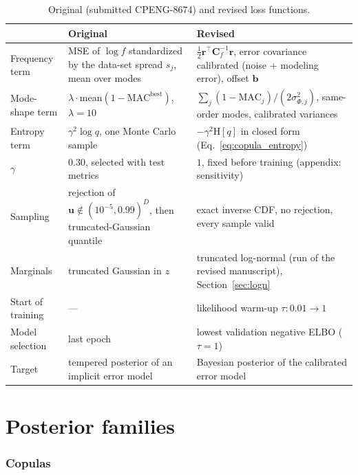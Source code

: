 \documentclass[11pt,a4paper]{article}
\numberwithin{equation}{section}
\theoremstyle{plain}
\theoremstyle{definition}
\theoremstyle{remark}
\newcommand{\uu}{\mathbf{u}}
\newcommand{\rr}{\mathbf{r}}
\newcommand{\bb}{\mathbf{b}}
\newcommand{\Cb}{\mathbf{C}}
\newcommand{\Hent}{\mathrm{H}}
\newcommand{\MAC}{\mathrm{MAC}}
\begin{document}
\begin{table}[h]
\centering
\caption{Original (submitted CPENG-8674) and revised loss functions.}
\label{tab:comparison}
\small
\begin{tabular}{@{}p{3.0cm}p{5.6cm}p{5.6cm}@{}}
\toprule
 & Original & Revised \\
\midrule
Frequency term & MSE of $\log f$ standardized by the data-set spread $s_j$, mean over modes & $\tfrac12\rr^\top\Cb_f^{-1}\rr$, error covariance calibrated (noise $+$ modeling error), offset $\bb$ \\
Mode-shape term & $\lambda\cdot$mean$(1-\MAC^{\text{best}})$, $\lambda=10$ & $\sum_j(1-\MAC_j)/(2\sigma_{\Phi,j}^2)$, same-order modes, calibrated variances \\
Entropy term & $\gamma^2\log q$, one Monte Carlo sample & $-\gamma^2\Hent[q]$ in closed form (Eq.~\eqref{eq:copula_entropy}) \\
$\gamma$ & $0.30$, selected with test metrics & $1$, fixed before training (appendix: sensitivity) \\
Sampling & rejection of $\uu\notin(10^{-5},0.99)^D$, then truncated-Gaussian quantile & exact inverse CDF, no rejection, every sample valid \\
Marginals & truncated Gaussian in $z$ & truncated log-normal (run of the revised manuscript), Section~\ref{sec:logn} \\
Start of training & --- & likelihood warm-up $\tau:0.01\to1$ \\
Model selection & last epoch & lowest validation negative ELBO ($\tau=1$) \\
Target & tempered posterior of an implicit error model & Bayesian posterior of the calibrated error model \\
\bottomrule
\end{tabular}
\end{table}

\part{Posterior families}
\label{part:families}

\section{Copulas}
\label{sec:copulas}
\end{document}
